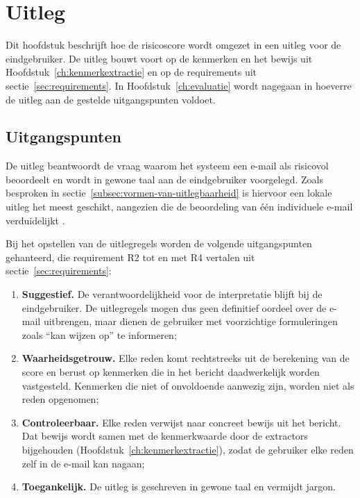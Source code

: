 \chapter{Uitleg}%
\label{ch:uitleg}

Dit hoofdstuk beschrijft hoe de risicoscore wordt omgezet in een uitleg voor de eindgebruiker. De uitleg bouwt voort op de kenmerken en het bewijs uit Hoofdstuk~\ref{ch:kenmerkextractie} en op de requirements uit sectie~\ref{sec:requirements}. In Hoofdstuk~\ref{ch:evaluatie} wordt nagegaan in hoeverre de uitleg aan de gestelde uitgangspunten voldoet.

\section{Uitgangspunten}%
\label{sec:uitgangspunten-uitleg}

De uitleg beantwoordt de vraag waarom het systeem een e-mail als risicovol beoordeelt en wordt in gewone taal aan de eindgebruiker voorgelegd. Zoals besproken in sectie~\ref{subsec:vormen-van-uitlegbaarheid} is hiervoor een lokale uitleg het meest geschikt, aangezien die de beoordeling van één individuele e-mail verduidelijkt \autocite{Guidotti2018}.

Bij het opstellen van de uitlegregels worden de volgende uitgangspunten gehanteerd, die requirement R2 tot en met R4 vertalen uit sectie~\ref{sec:requirements}:
\begin{enumerate}
    \item \textbf{Suggestief.} De verantwoordelijkheid voor de interpretatie blijft bij de eindgebruiker. De uitlegregels mogen dus geen definitief oordeel over de e-mail uitbrengen, maar dienen de gebruiker met voorzichtige formuleringen zoals ``kan wijzen op'' te informeren;
    \item \textbf{Waarheidsgetrouw.} Elke reden komt rechtstreeks uit de berekening van de score en berust op kenmerken die in het bericht daadwerkelijk worden vastgesteld. Kenmerken die niet of onvoldoende aanwezig zijn, worden niet als reden opgenomen;
    \item \textbf{Controleerbaar.} Elke reden verwijst naar concreet bewijs uit het bericht. Dat bewijs wordt samen met de kenmerkwaarde door de extractors bijgehouden (Hoofdstuk~\ref{ch:kenmerkextractie}), zodat de gebruiker elke reden zelf in de e-mail kan nagaan;
    \item \textbf{Toegankelijk.} De uitleg is geschreven in gewone taal en vermijdt jargon.
\end{enumerate}

